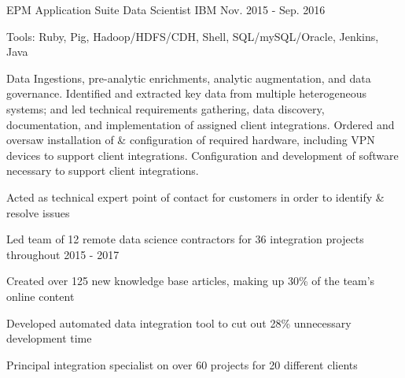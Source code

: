 \begin{cventries}
  \cvexpentry
    {EPM Application Suite} %
    {Data Scientist}
    {IBM}
    {Nov. 2015 - Sep. 2016}
    {
      \begin{cvheavyparagraph}
        Tools: Ruby, Pig, Hadoop/HDFS/CDH, Shell, SQL/mySQL/Oracle, Jenkins, Java
      \end{cvheavyparagraph}
    }
    {
      \begin{cvparagraph}
        Data Ingestions, pre-analytic enrichments, analytic augmentation, and data governance.  Identified and extracted key data from multiple heterogeneous systems; and led technical requirements gathering, data discovery, documentation, and implementation of assigned client integrations.  Ordered and oversaw installation of \& configuration of required hardware, including VPN devices to support client integrations.  Configuration and development of software necessary to support client integrations.
      \end{cvparagraph}
      \begin{cvitems} %
        \item {Acted as technical expert point of contact for customers in order to identify \& resolve issues}
        \item {Led team of 12 remote data science contractors for 36 integration projects throughout 2015 - 2017}
        \item {Created over 125 new knowledge base articles, making up 30\% of the team's online content}
        \item {Developed automated data integration tool to cut out 28\% unnecessary development time}
        \item {Principal integration specialist on over 60 projects for 20 different clients}
      \end{cvitems}
    }


\end{cventries}
